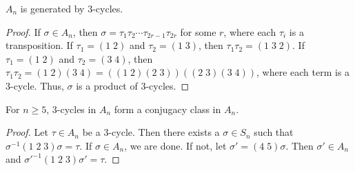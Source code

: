\begin{proposition}
    $A_{n}$ is generated by $3$-cycles.
\end{proposition}
\begin{proof}
    If $\sigma \in A_{n}$, then $\sigma = \tau_{1}\tau_{2}\cdots\tau_{2r-1}\tau_{2r}$ for some $r$, where each $\tau_{i}$ is a transposition. If $\tau_{1} = (1\;2)$ and $\tau_{2} = (1\;3)$, then $\tau_{1}\tau_{2} = (1\;3\;2)$. If $\tau_{1} = (1\;2)$ and $\tau_{2} = (3\;4)$, then $\tau_{1}\tau_{2} = (1\;2)(3\;4) = ((1\;2)(2\;3))((2\;3)(3\;4))$, where each term is a $3$-cycle. Thus, $\sigma$ is a product of $3$-cycles.
\end{proof}

\begin{proposition}
    For $n \geq 5$, $3$-cycles in $A_{n}$ form a conjugacy class in $A_{n}$.
\end{proposition}
\begin{proof}
    Let $\tau \in A_{n}$ be a $3$-cycle. Then there exists a $\sigma \in S_{n}$ such that $\sigma^{-1}(1\;2\;3)\sigma = \tau$. If $\sigma \in A_{n}$, we are done. If not, let $\sigma' = (4\;5)\sigma$. Then $\sigma' \in A_{n}$ and $\sigma'^{-1}(1\;2\;3)\sigma' = \tau$.
\end{proof}

